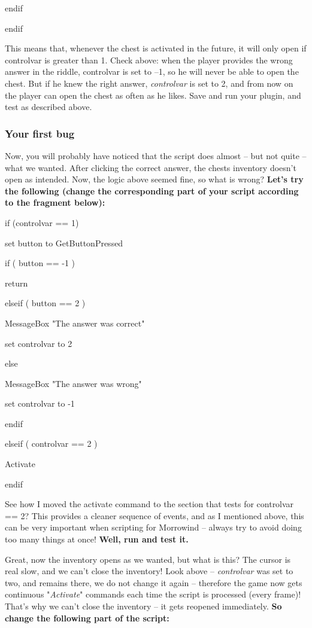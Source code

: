 \documentclass[
]{article}
\begin{document}
endif

endif

This means that, whenever the chest is activated in the future, it will
only open if controlvar is greater than 1. Check above: when the player
provides the wrong answer in the riddle, controlvar is set to --1, so he
will never be able to open the chest. But if he knew the right answer,
\emph{controlvar} is set to 2, and from now on the player can open the
chest as often as he likes. Save and run your plugin, and test as
described above.

\hypertarget{your-first-bug}{%
\subsubsection{Your first bug}\label{your-first-bug}}

Now, you will probably have noticed that the script does almost -- but
not quite -- what we wanted. After clicking the correct answer, the
chests inventory doesn't open as intended. Now, the logic above seemed
fine, so what is wrong? \textbf{Let's try the following (change the
corresponding part of your script according to the fragment below):}


if (controlvar == 1)

set button to GetButtonPressed

if ( button == -1 )

return

elseif ( button == 2 )

MessageBox "The answer was correct"

set controlvar to 2

else

MessageBox "The answer was wrong"

set controlvar to -1

endif

elseif ( controlvar == 2 )

Activate

endif

See how I moved the activate command to the section that tests for
controlvar == 2? This provides a cleaner sequence of events, and as I
mentioned above, this can be very important when scripting for Morrowind
-- always try to avoid doing too many things at once! \textbf{Well, run
and test it.}

Great, now the inventory opens as we wanted, but what is this? The
cursor is real slow, and we can't close the inventory! Look above --
\emph{controlvar} was set to two, and remains there, we do not change it
again -- therefore the game now gets continuous "\emph{Activate}"
commands each time the script is processed (every frame)! That's why we
can't close the inventory -- it gets reopened immediately. \textbf{So
change the following part of the script:}
\end{document}
